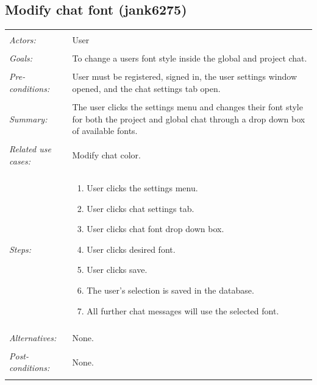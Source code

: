 \documentclass[11pt]{report}
\begin{document}
\begin{IDE-like Features}
\begin{}
\begin{Collaborative features that would be "nice":}
\subsection{Modify chat font (jank6275)}
\begin{tabular}{ p{2cm} p{12cm} }
 \hline
 \\
 \textit{Actors:} & User \\ 
 \\
 \textit{Goals:} & To change a users font style inside the global and project chat. \\
 \\
 \textit{Pre-conditions:} & User must be registered, signed in, the user settings window opened, and the chat settings tab open.  \\
 \\
 \textit{Summary:} & The user clicks the settings menu and changes their font style for both the project and global chat through a drop down box of available fonts. \\ 
 \\
 \textit{Related use cases:} & Modify chat color. \\ 
 \\
 \textit{Steps:} & \begin{enumerate}
  \item User clicks the settings menu.
  \item User clicks chat settings tab.
  \item User clicks chat font drop down box.
  \item User clicks desired font.
  \item User clicks save.
  \item The user's selection is saved in the database.
  \item All further chat messages will use the selected font.
 \end{enumerate} \\
 \\
 \textit{Alternatives:} & None. \\
 \\
 \textit{Post-conditions:} & None. \\
 \\
\hline
\end{tabular}


\end{Collaborative features that would be "nice":}
\end{}
\end{IDE-like Features}
\end{document}
